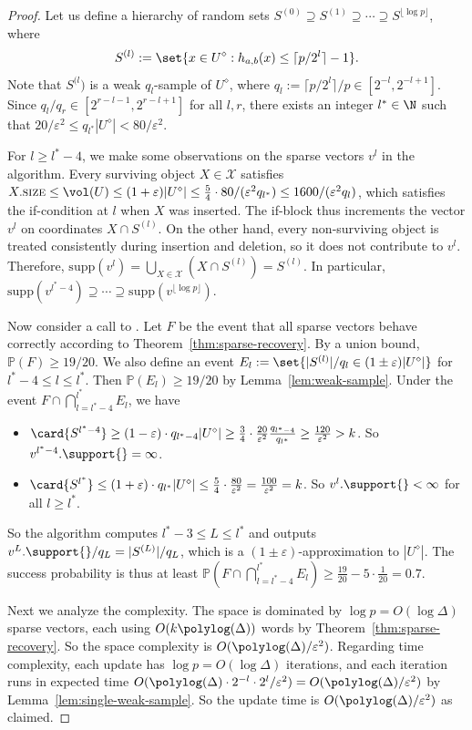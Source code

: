 \documentclass[a4paper, 11pt]{article}
\newcommand{\size}{\textsc{size}}
\newcommand{\supp}{\mathrm{supp}}
\newcommand{\eps}{\varepsilon}
\renewcommand{\Pr}{\mathbb{P}}
\newcommand{\class}[1]{\mathcal{#1}}
\newcommand{\discrete}[1]{#1^\diamond}
\begin{document}
\begin{proof}
    Let us define a hierarchy of random sets $S^{(0)} \supseteq S^{(1)} \supseteq \cdots \supseteq S^{\lfloor \log p \rfloor}$, where
    \[ S^{(l)} := \set{ x \in \discrete{U} : h_{a,b}(x) \leq \lceil p/2^l \rceil - 1 }. \]
    Note that $S^{(l})$ is a weak $q_l$-sample of $\discrete{U}$, where $q_l := \lceil p/2^l \rceil / p \in [2^{-l}, 2^{-l+1}]$. Since $q_l/q_r \in [2^{r-l-1}, 2^{r-l+1}]$ for all $l,r$, there exists an integer $l^* \in \N$ such that $20/\eps^2 \leq q_{l^*} |\discrete{U}| < 80/\eps^2$.
    
    For $l \geq l^*-4$, we make some observations on the sparse vectors $v^l$ in the algorithm. Every surviving object $X \in \class{X}$ satisfies $X.\size \leq \vol(U) \leq (1+\eps) |\discrete{U}| \leq \frac{5}{4} \cdot 80 / (\eps^2 q_{l^*}) \leq 1600 / (\eps^2 q_l)$, which satisfies the if-condition at $l$ when $X$ was inserted. The if-block thus increments the vector $v^l$ on coordinates $X \cap S^{(l)}$. On the other hand, every non-surviving object is treated consistently during insertion and deletion, so it does not contribute to $v^l$. Therefore, $\supp(v^l) = \bigcup_{X \in \class{X}} (X \cap S^{(l)}) = S^{(l)}$. In particular, $\supp(v^{l^*-4}) \supseteq \cdots \supseteq \supp(v^{\lfloor \log p \rfloor})$.

    Now consider a call to \est{}. Let $F$ be the event that all sparse vectors behave correctly according to Theorem~\ref{thm:sparse-recovery}. By a union bound, $\Pr(F) \geq 19/20$. We also define an event $E_l := \set{|S^{(l)}|/q_l \in (1 \pm \eps) |\discrete{U}|}$ for $l^*-4 \leq l \leq l^*$. Then $\Pr(E_l) \geq 19/20$ by Lemma~\ref{lem:weak-sample}. Under the event $F \cap \bigcap_{l=l^*-4}^{l^*} E_l$, we have
    \begin{itemize}
        \item $\card{S^{l^*-4}} \geq (1-\eps) \cdot q_{l^*-4} |\discrete{U}| \geq \frac{3}{4} \cdot \frac{20}{\eps^2} \frac{q_{l^*-4}}{q_{l^*}} \geq \frac{120}{\eps^2} > k$. So $v^{l^*-4}.\support{} = \infty$.
        \item $\card{S^{l^*}} \leq (1+\eps) \cdot q_{l^*} |\discrete{U}| \leq \frac{5}{4} \cdot \frac{80}{\eps^2} = \frac{100}{\eps^2} = k$. So $v^l.\support{} < \infty$ for all $l \geq l^*$.
    \end{itemize}
    So the algorithm computes $l^* - 3 \leq L \leq l^*$ and outputs $v^L.\support{}/q_L = |S^{(L)}|/q_L$, which is a $(1 \pm \eps)$-approximation to $|\discrete{U}|$. The success probability is thus at least $\Pr( F \cap \bigcap_{l=l^*-4}^{l^*} E_l ) \geq \frac{19}{20} - 5 \cdot \frac{1}{20} = 0.7$.

    Next we analyze the complexity. The space is dominated by $\log p = O(\log \Delta)$ sparse vectors, each using $O(k\polylog(\Delta))$ words by Theorem~\ref{thm:sparse-recovery}. So the space complexity is $O(\polylog(\Delta)/\eps^2)$. Regarding time complexity, each update has $\log p = O(\log \Delta)$ iterations, and each iteration runs in expected time $O(\polylog(\Delta) \cdot 2^{-l} \cdot 2^l/\eps^2) = O(\polylog(\Delta) / \eps^2)$ by Lemma~\ref{lem:single-weak-sample}. So the update time is $O(\polylog(\Delta) / \eps^2)$ as claimed.
\end{proof}
\end{document}
